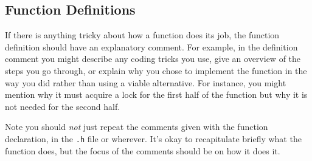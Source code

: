     \subsection{Function Definitions}
    If there is anything tricky about how a function does its job, the function definition should have an explanatory comment. For example, in the definition comment you might describe any coding tricks you use, give an overview of the steps you go through, or explain why you chose to implement the function in the way you did rather than using a viable alternative. For instance, you might mention why it must acquire a lock for the first half of the function but why it is not needed for the second half.

    Note you should \emph{not} just repeat the comments given with the function declaration, in the \texttt{.h} file or wherever. It's okay to recapitulate briefly what the function does, but the focus of the comments should be on how it does it.
